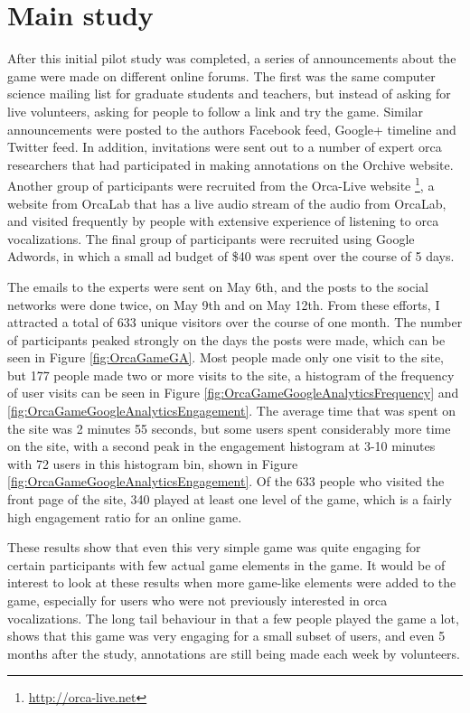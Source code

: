 \section{Main study}

After this initial pilot study was completed, a series of
announcements about the game were made on different online forums.
The first was the same computer science mailing list for graduate
students and teachers, but instead of asking for live volunteers,
asking for people to follow a link and try the game.  Similar
announcements were posted to the authors Facebook feed, Google+
timeline and Twitter feed.  In addition, invitations were sent out to
a number of expert orca researchers that had participated in making
annotations on the Orchive website.  Another group of participants
were recruited from the Orca-Live
website \footnote{\url{http://orca-live.net}}, a website from OrcaLab
that has a live audio stream of the audio from OrcaLab, and visited
frequently by people with extensive experience of listening to orca
vocalizations.  The final group of participants were recruited using
Google Adwords, in which a small ad budget of \$40 was spent over the
course of 5 days.

The emails to the experts were sent on May 6th, and the posts to the
social networks were done twice, on May 9th and on May 12th.  From
these efforts, I attracted a total of 633 unique visitors over the
course of one month.  The number of participants peaked strongly on
the days the posts were made, which can be seen in Figure
\ref{fig:OrcaGameGA}.  Most people made only one visit to the site,
but 177 people made two or more visits to the site, a histogram of the
frequency of user visits can be seen in Figure
\ref{fig:OrcaGameGoogleAnalyticsFrequency} and
\ref{fig:OrcaGameGoogleAnalyticsEngagement}.  The average time that
was spent on the site was 2 minutes 55 seconds, but some users spent
considerably more time on the site, with a second peak in the
engagement histogram at 3-10 minutes with 72 users in this histogram
bin, shown in Figure \ref{fig:OrcaGameGoogleAnalyticsEngagement}.  Of
the 633 people who visited the front page of the site, 340 played at
least one level of the game, which is a fairly high engagement ratio
for an online game.

These results show that even this very simple game was quite engaging
for certain participants with few actual game elements in the game.
It would be of interest to look at these results when more game-like
elements were added to the game, especially for users who were not
previously interested in orca vocalizations.  The long tail behaviour
\cite{heidorn2008shedding} in that a few people played the game a lot,
shows that this game was very engaging for a small subset of users,
and even 5 months after the study, annotations are still being made
each week by volunteers.


